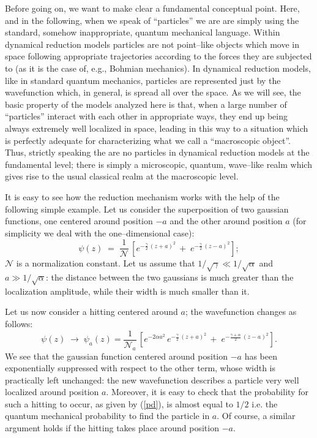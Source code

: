 \documentclass[12pt]{article}
\begin{document}
Before going on, we want to make clear a fundamental conceptual
point. Here, and in the following, when we speak of ``particles''
we are are simply using the standard, somehow inappropriate,
quantum mechanical language. Within dynamical reduction models
particles are not point--like objects which move in space
following appropriate trajectories according to the forces they
are subjected to (as it is the case of, e.g., Bohmian mechanics).
In dynamical reduction models, like in standard quantum mechanics,
particles are represented just by the wavefunction which, in
general, is spread all over the space. As we will see, the basic
property of the models  analyzed here is that, when a large number
of ``particles'' interact with each other in appropriate ways,
they end up being always extremely well localized in space,
leading in this way to a situation which is perfectly adequate for
characterizing what we call a ``macroscopic object''. Thus,
strictly speaking \cite{bells} the are no particles in dynamical
reduction models at the fundamental level; there is simply a
microscopic, quantum, wave--like realm which gives rise to the
usual classical realm at the macroscopic level.

It is easy to see how the reduction mechanism works with the help
of the following simple example. Let us consider the superposition
of two gaussian functions, one centered around position $-a$ and
the other around position $a$ (for simplicity we deal with the
one--dimensional case):
\begin{equation}
\psi(z) \; = \; \frac{1}{\mathcal N}\, \left[ e^{\displaystyle
-\frac{\gamma}{2}\, (z + a)^{2}} \, + \; e^{\displaystyle
-\frac{\gamma}{2}\, (z - a)^{2}} \right];
\end{equation}
${\mathcal N}$ is a normalization constant. Let us assume that
$1/\sqrt{\gamma} \ll 1/\sqrt{\alpha}$ and $a \gg 1/\sqrt{\alpha}$:
the distance between the two gaussians is much greater than the
localization amplitude, while their width is much smaller than it.

Let us now consider a hitting centered around $a$; the
wavefunction changes as follows:
\begin{equation}
\psi(z) \; \longrightarrow \; \psi_{a}(z) = \frac{1}{{\mathcal
N}_{a}}\, \left[e^{\displaystyle -2\alpha a^{2}}\,
e^{\displaystyle -\frac{\gamma}{2}\, (z + a)^{2}} \, + \;
e^{\displaystyle -\frac{\gamma + \alpha}{2}\, (z - a)^{2}}
\right].
\end{equation}
We see that the gaussian function centered around position $-a$
has been exponentially suppressed with respect to the other term,
whose width is practically left unchanged: the new wavefunction
describes a particle very well localized around position $a$.
Moreover, it is easy to check that the probability for such a
hitting to occur, as given by (\ref{pd}), is almost equal to $1/2$
i.e. the quantum mechanical probability to find the particle in
$a$. Of course, a similar argument holds if the hitting takes
place around position $-a$.
\end{document}
